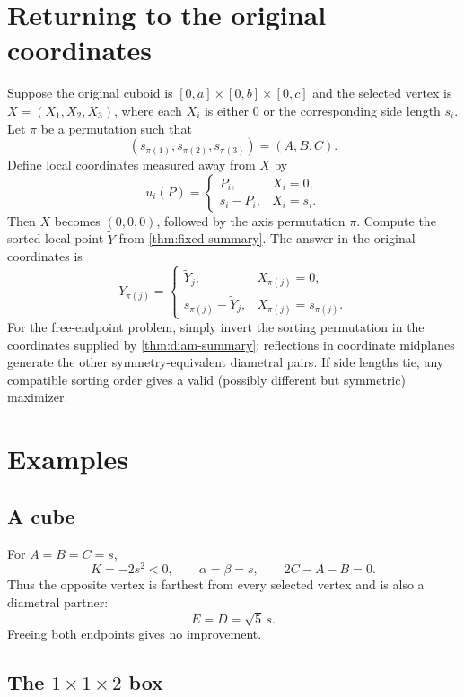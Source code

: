 \documentclass[11pt]{article}
\theoremstyle{definition}
\begin{document}
\section{Returning to the original coordinates}\label{sec:transport}

Suppose the original cuboid is
$[0,a]\times[0,b]\times[0,c]$ and the selected vertex is
$X=(X_1,X_2,X_3)$, where each $X_i$ is either $0$ or the corresponding side
length $s_i$.  Let $\pi$ be a permutation such that
\[
  (s_{\pi(1)},s_{\pi(2)},s_{\pi(3)})=(A,B,C).
\]
Define local coordinates measured away from $X$ by
\begin{equation}\label{eq:localcoords}
  u_i(P)=
  \begin{cases}
    P_i,&X_i=0,\\
    s_i-P_i,&X_i=s_i.
  \end{cases}
\end{equation}
Then $X$ becomes $(0,0,0)$, followed by the axis permutation $\pi$.  Compute
the sorted local point $\widetilde Y$ from \cref{thm:fixed-summary}.  The
answer in the original coordinates is
\begin{equation}\label{eq:undo}
  Y_{\pi(j)}=
  \begin{cases}
    \widetilde Y_j,&X_{\pi(j)}=0,\\
    s_{\pi(j)}-\widetilde Y_j,&X_{\pi(j)}=s_{\pi(j)}.
  \end{cases}
\end{equation}
For the free-endpoint problem, simply invert the sorting permutation in the
coordinates supplied by \cref{thm:diam-summary}; reflections in coordinate
midplanes generate the other symmetry-equivalent diametral pairs.  If side
lengths tie, any compatible sorting order gives a valid (possibly different
but symmetric) maximizer.

\section{Examples}

\subsection{A cube}

For $A=B=C=s$,
\[
  K=-2s^2<0,\qquad \alpha=\beta=s,
  \qquad 2C-A-B=0.
\]
Thus the opposite vertex is farthest from every selected vertex and is also a
diametral partner:
\[
  E=D=\sqrt5\,s.
\]
Freeing both endpoints gives no improvement.

\subsection{\texorpdfstring{The $1\times1\times2$ box}{The 1 x 1 x 2 box}}
\end{document}
